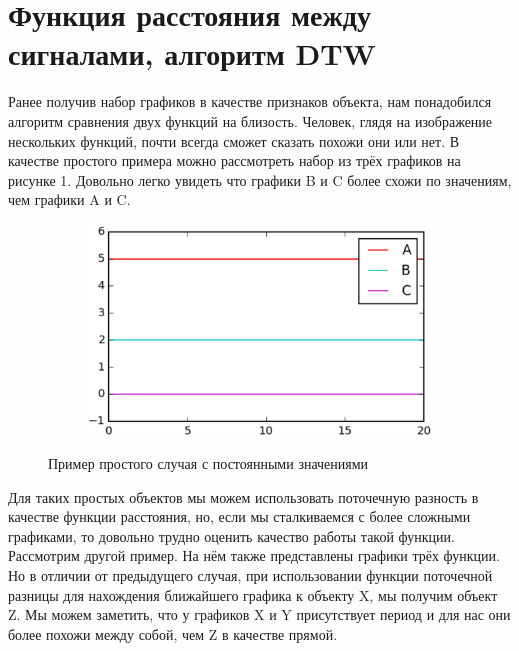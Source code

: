 \section{Функция расстояния между сигналами, алгоритм DTW}

Ранее получив набор графиков в качестве признаков объекта, нам понадобился алгоритм сравнения двух функций на близость. Человек, глядя на изображение нескольких функций, почти всегда сможет сказать похожи они или нет. В качестве простого примера можно рассмотреть набор из трёх графиков на рисунке 1. Довольно легко увидеть что графики B и C более схожи по значениям, чем графики A и C.

\begin{figure}[ht]
	\centering
    \begin{subfigure}[b]{1\textwidth}
    \centering
        \includegraphics[scale=0.5]{pasted-image-35.png}        
    \end{subfigure}
 
    \caption{Пример простого случая с постоянными значениями}
    \label{fig_parsetree}
\end{figure}

Для таких простых объектов мы можем использовать поточечную разность в качестве функции расстояния, но, если мы сталкиваемся с более сложными графиками, то довольно трудно оценить качество работы такой функции. Рассмотрим другой пример. На нём также представлены графики трёх функции. Но в отличии от предыдущего случая, при использовании функции поточечной разницы для нахождения ближайшего графика к объекту X, мы получим объект Z. Мы можем заметить, что у графиков X и Y присутствует период и для нас они более похожи между собой, чем Z в качестве прямой.

